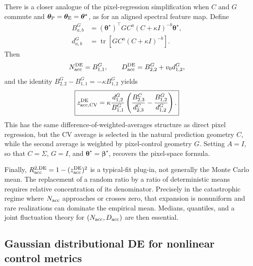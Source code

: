 \documentclass[11pt]{article}
\newcommand{\tr}{\operatorname{tr}}
\newcommand{\bstar}{\bm\beta^{\star}}
\newcommand{\tstar}{\bm\theta^{\star}}
\begin{document}
There is a closer analogue of the pixel-regression simplification when $C$
and $G$ commute and $\bm\theta_{\rm P}=\bm\theta_{\rm E}=\tstar$, as for an
aligned spectral feature map.  Define
\begin{align}
  B_{a,b}^{G}
    &=(\tstar)^{\top}G C^a(C+\kappa I)^{-b}\tstar,\\
  d_{a,b}^{G}
    &=\tr[G C^a(C+\kappa I)^{-b}].
\end{align}
Then
\begin{equation}
  N_{\rm acc}^{\rm DE}=B_{1,1}^{G},
  \qquad
  D_{\rm acc}^{\rm DE}=B_{2,2}^{G}+v_0d_{1,2}^{G},
\end{equation}
and the identity $B_{2,2}^{G}-B_{1,1}^{G}=-\kappa B_{1,2}^{G}$ yields
\begin{equation}
  \boxed{
  z_{\rm acc,CV}^{\rm DE}
  =\kappa\frac{d_{1,2}^{G}}{B_{1,1}^{G}}
   \left(
     \frac{B_{2,3}^{C}}{d_{2,3}^{C}}
     -\frac{B_{1,2}^{G}}{d_{1,2}^{G}}
   \right).}
  \label{eq:aligned-feature-z-cv}
\end{equation}
This has the same difference-of-weighted-averages structure as direct pixel
regression, but the CV average is selected in the natural prediction geometry
$C$, while the second average is weighted by pixel-control geometry $G$.
Setting $A=I$, so that $C=\Sigma$, $G=I$, and $\tstar=\bstar$, recovers the
pixel-space formula.

Finally, $R_{\rm acc}^{2,\rm DE}=1-(z_{\rm acc}^{\rm DE})^2$ is a typical-fit
plug-in, not generally the Monte Carlo mean.  The replacement of a random
ratio by a ratio of deterministic means requires relative concentration of
its denominator.  Precisely in the catastrophic regime where
$N_{\rm acc}$ approaches or crosses zero, that expansion is nonuniform and
rare realizations can dominate the empirical mean.  Medians, quantiles, and a
joint fluctuation theory for $(N_{\rm acc},D_{\rm acc})$ are then essential.

\subsection{Gaussian distributional DE for nonlinear control metrics}
\label{sec:gaussian-distributional-de}
\end{document}
